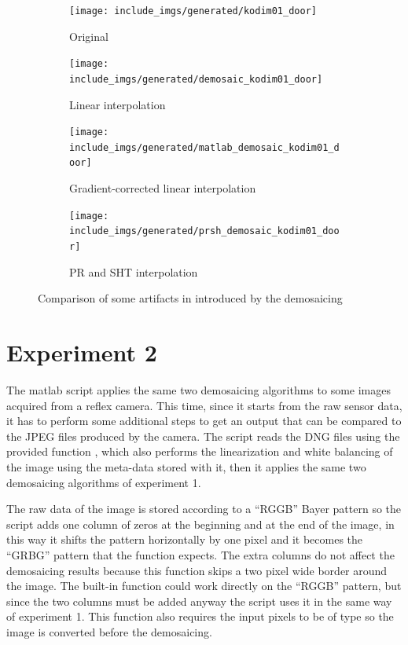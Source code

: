 \documentclass[a4paper,oneside]{article}
\begin{document}
\begin{figure}[htbp]
  \centering
  \begin{subfigure}{0.5\textwidth}
    \centering
    \texttt{[image: include\_imgs/generated/kodim01\_door]}
    \caption{Original}
  \end{subfigure}%
  \begin{subfigure}{0.5\textwidth}
    \centering
    \texttt{[image: include\_imgs/generated/demosaic\_kodim01\_door]}
    \caption{Linear interpolation}
  \end{subfigure}
  \begin{subfigure}{0.5\textwidth}
    \centering
    \texttt{[image: include\_imgs/generated/matlab\_demosaic\_kodim01\_door]}
    \caption{Gradient-corrected linear interpolation}
  \end{subfigure}%
  \begin{subfigure}{0.5\textwidth}
    \centering
    \texttt{[image: include\_imgs/generated/prsh\_demosaic\_kodim01\_door]}
    \caption{PR and SHT interpolation}
  \end{subfigure}
  \caption{Comparison of some artifacts in 
    introduced by the demosaicing}
  \label{fig:wall}
\end{figure}



\section*{Experiment 2}
The matlab script  applies the same two demosaicing
algorithms to some images acquired from a reflex camera. This time,
since it starts from the raw sensor data, it has to perform some
additional steps to get an output that can be compared to the JPEG
files produced by the camera. The script reads the DNG files using the
provided function , which also performs the
linearization and white balancing of the image using the meta-data
stored with it, then it applies the same two demosaicing algorithms
of experiment 1.

The raw data of the image is stored according to a ``RGGB'' Bayer
pattern so the script adds one column of zeros at the beginning and at
the end of the image, in this way it shifts the pattern horizontally
by one pixel and it becomes the ``GRBG'' pattern that the function
 expects. The extra columns do not affect
the demosaicing results because this function skips a two pixel wide
border around the image.  The built-in  function
could work directly on the ``RGGB'' pattern, but since the two columns
must be added anyway the script uses it in the same way of experiment
1. This function also requires the input pixels to be of type
 so the image is converted before the demosaicing.
\end{document}
